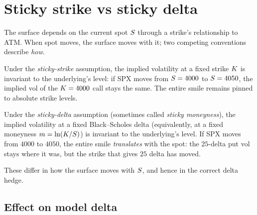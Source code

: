 \section{Sticky strike vs sticky delta}
\label{sec:ch17_sticky}

The surface depends on the current spot $S$ through a strike's
relationship to ATM. When spot moves, the surface moves with it;
two competing conventions describe \emph{how}.

\begin{definition}
Under the \emph{sticky-strike} assumption, the implied volatility
at a fixed strike $K$ is invariant to the underlying's
level: if SPX moves from $S = 4000$ to $S = 4050$, the
implied vol of the $K = 4000$ call stays the same. The
entire smile remains pinned to absolute strike levels.
\end{definition}

\begin{definition}
Under the \emph{sticky-delta} assumption (sometimes called
\emph{sticky moneyness}), the implied volatility at a fixed
Black--Scholes delta (equivalently, at a fixed moneyness $m
= \ln(K/S)$) is invariant to the underlying's level.
If SPX moves from $4000$ to $4050$, the entire smile
\emph{translates} with the spot: the $25$-delta put vol stays
where it was, but the strike that gives $25$ delta has moved.
\end{definition}

These differ in how the surface moves with $S$, and hence in
the correct delta hedge.

\subsection{Effect on model delta}
\label{subsec:ch17_sticky_delta}

